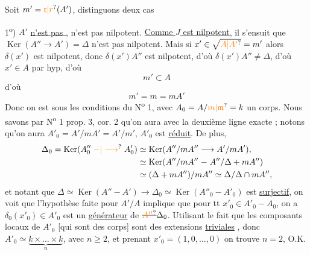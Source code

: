 Soit $m'=\unsure{\mathfrak r|r}(A')$, distinguons deux cas

1\textsuperscript{o}) $A'$ \uline{n'est pas ,}    n'est pas nilpotent. \uline{Comme $J$ est nilpotent}, il s'ensuit que $\operatorname{Ker}(A''\longrightarrow A')=\Delta$ n'est pas nilpotent. Mais si $x'\in\sqrt{\unsure{A|A'}}=m'$  alors $\delta(x')$ est nilpotent, donc $\delta(x')A''$ est nilpotent, d'où $\delta(x')A''\ne\Delta$, d'où $x'\in A$ par hyp, d'où
\[
m'\subset A
\]
 d'où
\[
m'=m=mA'
\]
Donc on est sous les conditions du N\textsuperscript{o} 1, avec $A_0=A/\unsure{m|\mathfrak m}=k$ un corps.  Nous savons par N\textsuperscript{o} 1 prop. 3, cor. 2 qu'on aura
avec la deuxième ligne exacte ; notons qu'on aura $A'_0=A'/mA'=A'/m'$, $A'_0$ est \uline{réduit}. De plus,
\[
\begin{aligned}
\Delta_0=\operatorname{Ker}(A''_0\mathrel{\unsure{-|\longrightarrow}}A'_0)&\simeq\operatorname{Ker}(A''/mA''\longrightarrow A'/mA'),\\
&\simeq\operatorname{Ker}(A''/mA''\mathrel{-}A''/\Delta+mA'')\\
&\simeq(\Delta+mA'')/mA''\simeq\Delta/\Delta\cap mA'',
\end{aligned}
\]
et notant que $\Delta\simeq\operatorname{Ker}(A''\mathrel{-}A')\longrightarrow\Delta_0\simeq\operatorname{Ker}(A''_0\mathrel{-}A'_0)$ est \uline{surjectif}, on voit que  l'hypothèse faite pour $A'/A$ implique que pour tt $x'_0\in A'_0-A_0$, on a $\delta_0(x'_0)\in A'_0$ est un \uline{générateur} de $\deleted{\unsure{A''}}\Delta_0$. Utilisant le fait que les composants locaux de $A'_0$  [qui sont des corps] sont des extensions \uline{triviales} ,  donc $A'_0\simeq\underbrace{k\times\ldots\times k}_{n}$, avec $n\geq2$, et prenant $x'_0=(1,0,\ldots,0)$ on trouve $n=2$, O.K.
